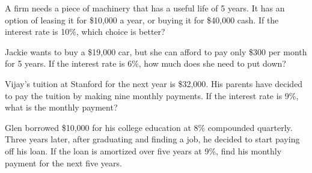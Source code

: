         \begin{puzzle}
        A firm needs a piece of machinery that has a useful life of 5 years. It has an option of leasing it for \$10,000 a year, or buying it for \$40,000 cash. If the interest rate is 10\%, which choice is better?
        \end{puzzle}
        
        \begin{puzzle}
        Jackie wants to buy a \$19,000 car, but she can afford to pay only \$300 per month for 5 years. If the interest rate is 6\%, how much does she need to put down?
        \end{puzzle}
        
        \begin{puzzle}
        Vijay’s tuition at Stanford for the next year is \$32,000. His parents have decided to pay the tuition by making nine monthly payments. If the interest rate is 9\%, what is the monthly payment?
        \end{puzzle}
        
        \begin{puzzle}
        Glen borrowed \$10,000 for his college education at 8\% compounded quarterly. Three years later, after graduating and finding a job, he decided to start paying off his loan. If the loan is amortized over five years at 9\%, find his monthly payment for the next five years.
        \end{puzzle}
        